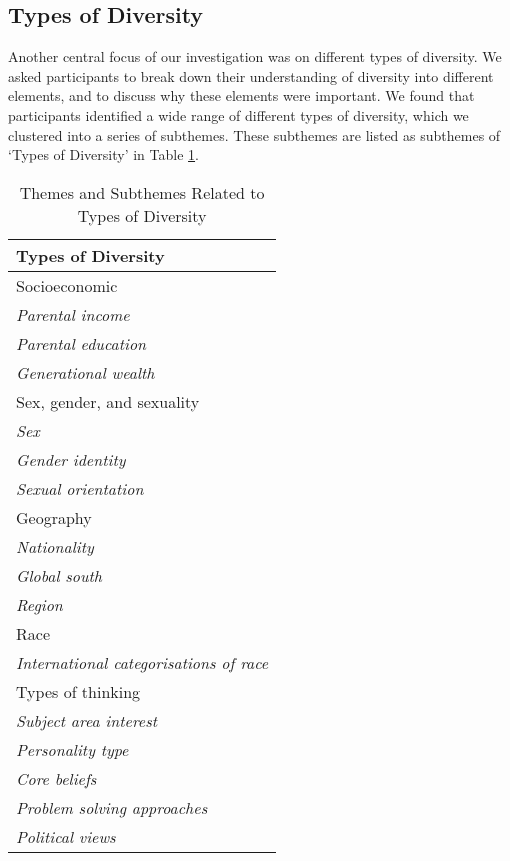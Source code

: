 \subsection{Types of Diversity}
Another central focus of our investigation was on different types of diversity. We asked participants to break down their understanding of diversity into different elements, and to discuss why these elements were important. We found that participants identified a wide range of different types of diversity, which we clustered into a series of subthemes. These subthemes are listed as subthemes of `Types of Diversity' in Table \ref{tab:typesdiv}.

\begin{table}[h]
    \centering
    \caption{Themes and Subthemes Related to Types of Diversity}
    \label{tab:typesdiv}
    \begin{tabular}{|l|}
        \hline
        \textbf{Types of Diversity} \\
        \hline
        Socioeconomic \\
        \emph{Parental income} \\
        \emph{Parental education} \\
        \emph{Generational wealth} \\
        Sex, gender, and sexuality \\
        \emph{Sex} \\
        \emph{Gender identity} \\
        \emph{Sexual orientation} \\
        Geography \\
        \emph{Nationality} \\
        \emph{Global south} \\
        \emph{Region} \\
        Race \\
        \emph{International categorisations of race} \\
        Types of thinking \\
        \emph{Subject area interest} \\
        \emph{Personality type} \\
        \emph{Core beliefs} \\
        \emph{Problem solving approaches} \\
        \emph{Political views} \\
        \hline
    \end{tabular}
\end{table}


